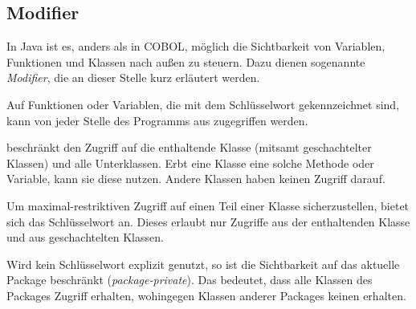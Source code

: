 \subsection{Modifier}
In Java ist es, anders als in COBOL, möglich die Sichtbarkeit von Variablen, Funktionen und Klassen nach außen zu steuern. Dazu dienen sogenannte \textit{Modifier}, die an dieser Stelle kurz erläutert werden.

Auf Funktionen oder Variablen, die mit dem Schlüsselwort  gekennzeichnet sind, kann von jeder Stelle des Programms aus zugegriffen werden.

 beschränkt den Zugriff auf die enthaltende Klasse (mitsamt geschachtelter Klassen) und alle Unterklassen. Erbt eine Klasse eine solche Methode oder Variable, kann sie diese nutzen. Andere Klassen haben keinen Zugriff darauf.

Um maximal-restriktiven Zugriff auf einen Teil einer Klasse sicherzustellen, bietet sich das Schlüsselwort  an. Dieses erlaubt nur Zugriffe aus der enthaltenden Klasse und aus geschachtelten Klassen.

Wird kein Schlüsselwort explizit genutzt, so ist die Sichtbarkeit auf das aktuelle Package beschränkt (\engl \textit{package-private}). Das bedeutet, dass alle Klassen des Packages Zugriff erhalten, wohingegen Klassen anderer Packages keinen erhalten.